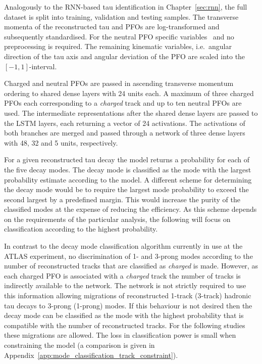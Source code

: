 Analogously to the RNN-based tau identification in Chapter~\ref{sec:rnn}, the
full dataset is split into training, validation and testing samples. The
transverse momenta of the reconstructed tau and PFOs are log-transformed and
subsequently standardised. For the neutral PFO specific
variables~ and
 no preprocessing is required. The
remaining kinematic variables, i.e.\ angular direction of the tau axis and
angular deviation of the PFO are scaled into the~$[-1, 1]$-interval.

Charged and neutral PFOs are passed in ascending transverse momentum ordering
 to shared dense layers with 24 units each. A maximum of
three charged PFOs each corresponding to a \emph{charged} track and up to ten
neutral PFOs are used. The intermediate representations after the shared dense
layers are passed to the LSTM layers, each returning a vector of 24 activations.
The activations of both branches are merged and passed through a network of
three dense layers with 48, 32 and 5 units, respectively.

For a given reconstructed tau decay the model returns a probability for each of
the five decay modes. The decay mode is classified as the mode with the largest
probability estimate according to the model. A different scheme for determining
the decay mode would be to require the largest mode probability to exceed the
second largest by a predefined margin. This would increase the purity of the
classified modes at the expense of reducing the efficiency. As this scheme
depends on the requirements of the particular analysis, the following will focus
on classification according to the highest probability.

In contrast to the decay mode classification algorithm currently in use at the
ATLAS experiment, no discrimination of 1- and 3-prong modes according to the
number of reconstructed tracks that are classified as \emph{charged} is made.
However, as each charged PFO is associated with a \emph{charged} track the
number of tracks is indirectly available to the network. The network is not
strictly required to use this information allowing migrations of reconstructed
1-track (3-track) hadronic tau decays to 3-prong (1-prong) modes. If this
behaviour is not desired then the decay mode can be classified as the mode with
the highest probability that is compatible with the number of reconstructed
tracks. For the following studies these migrations are allowed. The loss in
classification power is small when constraining the model (a comparison is given
in Appendix~\ref{app:mode_classification_track_constraint}). 


